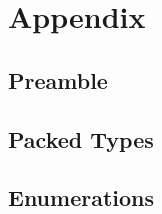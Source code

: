

\section{Appendix}

\subsection{Preamble}



\subsection{Packed Types}



\subsection{Enumerations}




